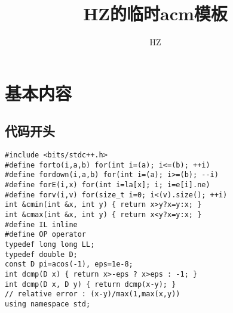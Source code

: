\documentclass{article}
\begin{document}
\title{HZ的临时acm模板}
\author{HZ}
\maketitle
\tableofcontents

\section{基本内容}

\subsection{代码开头}
\begin{lstlisting}
#include <bits/stdc++.h>
#define forto(i,a,b) for(int i=(a); i<=(b); ++i)
#define fordown(i,a,b) for(int i=(a); i>=(b); --i)
#define forE(i,x) for(int i=la[x]; i; i=e[i].ne)
#define forv(i,v) for(size_t i=0; i<(v).size(); ++i)
int &cmin(int &x, int y) { return x>y?x=y:x; }
int &cmax(int &x, int y) { return x<y?x=y:x; }
#define IL inline
#define OP operator
typedef long long LL;
typedef double D;
const D pi=acos(-1), eps=1e-8;
int dcmp(D x) { return x>-eps ? x>eps : -1; }
int dcmp(D x, D y) { return dcmp(x-y); }
// relative error : (x-y)/max(1,max(x,y))
using namespace std;
\end{lstlisting}
\end{document}
